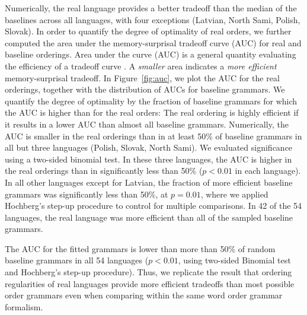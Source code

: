 Numerically, the real language provides a better tradeoff than the median of the baselines across all languages, with four exceptions (Latvian, North Sami, Polish, Slovak). In order to quantify the degree of optimality of real orders, we further computed the area under the memory-surprisal tradeoff curve (AUC) for real and baseline orderings.
Area under the curve (AUC) is a general quantity evaluating the efficiency of a tradeoff curve \citep{bradley1997use}.
A \emph{smaller} area indicates a \emph{more efficient} memory-surprisal tradeoff.
In Figure~\ref{fig:auc}, we plot the AUC for the real orderings, together with the distribution of AUCs for baseline grammars.
We quantify the degree of optimality by the fraction of baseline grammars for which the AUC is higher than for the real orders:
The real ordering is highly efficient if it results in a lower AUC than almost all baseline grammars.
Numerically, the AUC is smaller in the real orderings than in at least 50\% of baseline grammars in all but three languages (Polish, Slovak, North Sami).
We evaluated significance using a two-sided binomial test.
In these three languages, the AUC is higher in the real orderings than in significantly less than 50\% ($p < 0.01$ in each language).
In all other languages except for Latvian, the fraction of more efficient baseline grammars was significantly less than 50\%, at $p=0.01$, where we applied Hochberg's step-up procedure \citep{hochberg1988sharper} to control for multiple comparisons.
In 42 of the 54 languages, the real language was more efficient than all of the sampled baseline grammars. %



The AUC for the fitted grammars is lower than more than 50\% of random baseline grammars in all 54 languages ($p < 0.01$, using two-sided Binomial test and Hochberg's step-up procedure). Thus, we replicate the result that ordering regularities of real languages provide more efficient tradeoffs than most possible order grammars even when comparing within the same word order grammar formalism.


